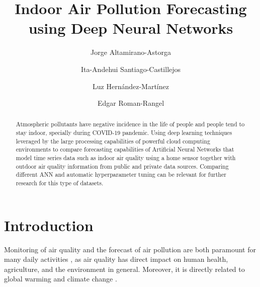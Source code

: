 \documentclass{llncs}
\begin{document}
    \title{Indoor Air Pollution Forecasting using Deep Neural Networks}
    
    \author{Jorge Altamirano-Astorga \and
        Ita-Andehui Santiago-Castillejos \and
        Luz Hernández-Martínez \and
        Edgar Roman-Rangel}
    
    \maketitle
 
    \begin{abstract}
        Atmospheric pollutants have negative incidence in the life of 
        people and people tend to stay indoor, specially during COVID-19 
        pandemic. Using deep learning techniques leveraged by the large 
        processing capabilities of powerful cloud computing environments
        to compare forecasting capabilities of Artificial Neural Networks
        that model time series data such as indoor air quality using 
        a home sensor together with outdoor air quality information from
        public and private data sources. Comparing different ANN and
        automatic hyperparameter tuning can be relevant for further research
        for this type of datasets.
    \end{abstract}

    \hypertarget{introduction}{%
\section{Introduction}\label{introduction}}


Monitoring of air quality and the forecast of air pollution are both
paramount for many daily activities \cite{patni}, as air quality has 
direct impact on
human health, agriculture, and the environment in general. Moreover, it
is directly related to global warming and climate change \cite{airpollution}.

\end{document}
